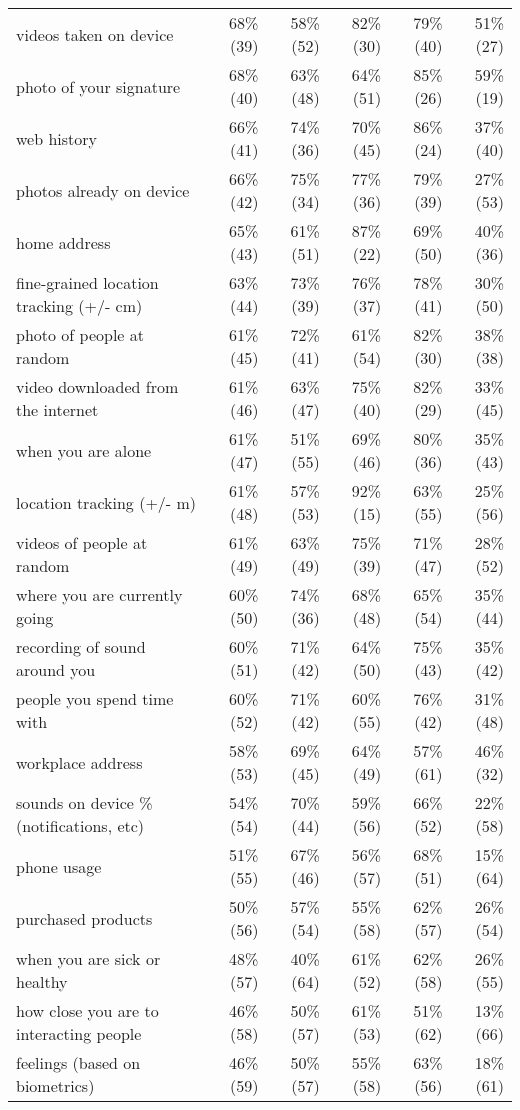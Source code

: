 \begin{table*}[t]
\begin{center}
\begin{tabular}{| l | r | r | r | r | r |}
videos taken on device & 68\% (39) & 58\% (52) & 82\% (30) & 79\% (40) & 51\% (27) \\ 
photo of your signature & 68\% (40) & 63\% (48) & 64\% (51) & 85\% (26) & 59\% (19) \\ 
web history & 66\% (41) & 74\% (36) & 70\% (45) & 86\% (24) & 37\% (40) \\ 
photos already on device & 66\% (42) & 75\% (34) & 77\% (36) & 79\% (39) & 27\% (53) \\ 
home address & 65\% (43) & 61\% (51) & 87\% (22) & 69\% (50) & 40\% (36) \\ 
fine-grained location tracking (+/-  cm) & 63\% (44) & 73\% (39) & 76\% (37) & 78\% (41) & 30\% (50) \\ 
photo of people at random & 61\% (45) & 72\% (41) & 61\% (54) & 82\% (30) & 38\% (38) \\ 
video downloaded from the internet & 61\% (46) & 63\% (47) & 75\% (40) & 82\% (29) & 33\% (45) \\ 
when you are alone & 61\% (47) & 51\% (55) & 69\% (46) & 80\% (36) & 35\% (43) \\ 
location tracking (+/- m) & 61\% (48) & 57\% (53) & 92\% (15) & 63\% (55) & 25\% (56) \\ 
videos of people at random & 61\% (49) & 63\% (49) & 75\% (39) & 71\% (47) & 28\% (52) \\ 
where you are currently going & 60\% (50) & 74\% (36) & 68\% (48) & 65\% (54) & 35\% (44) \\ 
recording of sound around you & 60\% (51) & 71\% (42) & 64\% (50) & 75\% (43) & 35\% (42) \\ 
people you spend time with & 60\% (52) & 71\% (42) & 60\% (55) & 76\% (42) & 31\% (48) \\ 
workplace address & 58\% (53) & 69\% (45) & 64\% (49) & 57\% (61) & 46\% (32) \\ 
sounds on device \% (notifications, etc) & 54\% (54) & 70\% (44) & 59\% (56) & 66\% (52) & 22\% (58) \\ 
phone usage & 51\% (55) & 67\% (46) & 56\% (57) & 68\% (51) & 15\% (64) \\ 
purchased products & 50\% (56) & 57\% (54) & 55\% (58) & 62\% (57) & 26\% (54) \\ 
when you are sick or healthy & 48\% (57) & 40\% (64) & 61\% (52) & 62\% (58) & 26\% (55) \\ 
how close you are to interacting people & 46\% (58) & 50\% (57) & 61\% (53) & 51\% (62) & 13\% (66) \\ 
feelings (based on biometrics) & 46\% (59) & 50\% (57) & 55\% (58) & 63\% (56) & 18\% (61) \\ 

\end{tabular}
\end{center}
\end{table*}
